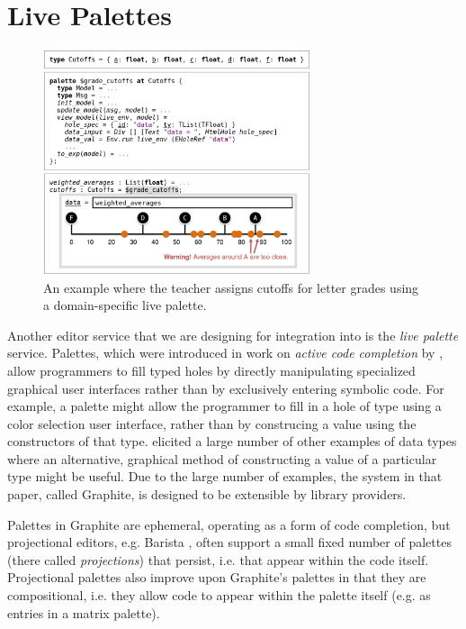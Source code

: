 
\section{Live Palettes}
\label{sec:palettes}


\begin{figure}[t]
\vspace{-4px}
\includegraphics[width=0.7\textwidth]{images/cutoffs-new.png}
\caption{An example where the teacher assigns cutoffs 
for letter grades using a domain-specific live palette.}
\label{fig:cutoffs-example}
\vspace{-4px}
\end{figure}

Another editor service that we are designing for integration into \Hazel 
is the \emph{live palette} service. 
Palettes, which were introduced in work on
\emph{active code completion} by \citet{ActiveCodeCompletion},  allow programmers to fill typed 
holes by directly manipulating specialized graphical user interfaces rather than by exclusively entering symbolic
code. For example, a palette might allow the programmer to 
fill in a hole of type  using a color selection  
user interface, rather than by construcing a  value  
using the constructors of that type. \citet{ActiveCodeCompletion} elicited a large number of other
examples of data types where an alternative, graphical 
method of constructing a value of a particular type might be
useful. Due to the large number of examples, the system in that paper, called {Graphite}, is designed to be extensible by library providers. 

Palettes in {Graphite} 
are ephemeral, operating as a form of code completion, but projectional editors, e.g. Barista \cite{ko_barista:_2006}, often support a small fixed number of  
palettes (there called \emph{projections}) that persist, i.e. that appear within the code itself. 
Projectional palettes also improve upon Graphite's palettes in that they are compositional, i.e. they allow code to appear within the palette itself (e.g. as entries in a matrix palette). 

